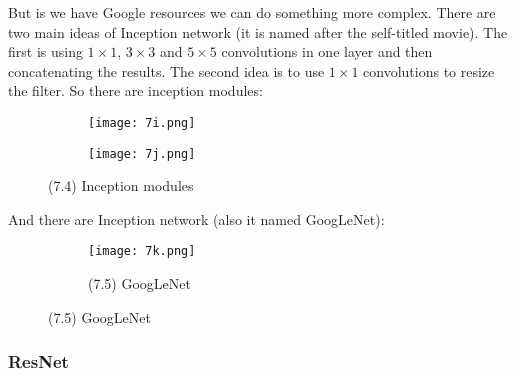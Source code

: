 But is we have Google resources we can do something more complex. There are two main ideas of Inception network (it is named after the self-titled movie). The first is using $1\times1$, $3\times3$ and $5\times5$ convolutions in one layer and then concatenating the results. The second idea is to use $1\times1$ convolutions to resize the filter. {\it <How it resizes filters>} So there are inception modules:\\
\begin{figure}[h]
  \centering
  \begin{subfigure}[l]{0.4\linewidth}
    \texttt{[image: 7i.png]}
  \end{subfigure}
  \hspace{0.5cm}
  \begin{subfigure}[r]{0.4\linewidth}
    \texttt{[image: 7j.png]}
  \end{subfigure}
  \caption*{(7.4) Inception modules}
\end{figure}
And there are Inception network (also it named GoogLeNet):
\begin{figure}[h]
  \centering
  \begin{subfigure}[c]{0.7\linewidth}
    \texttt{[image: 7k.png]}
    \caption*{(7.5) GoogLeNet}
  \end{subfigure}
\end{figure}

\vspace{-0.5cm}
\subsubsection*{ResNet}

